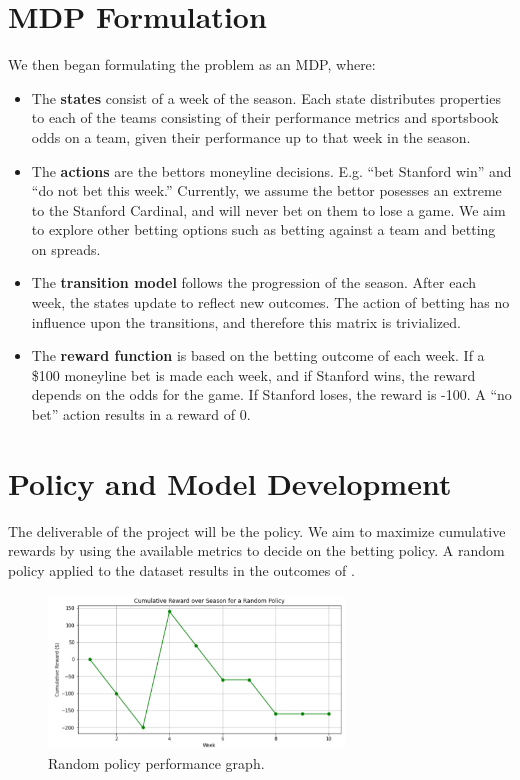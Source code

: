 \documentclass{article}
\begin{document}
\section*{MDP Formulation}

We then began formulating the problem as an MDP, where:
\begin{itemize}
    \item The \textbf{states} consist of a week of the season. Each state distributes properties to each of the teams consisting of their performance metrics and sportsbook odds on a team, given their performance up to that week in the season.
    \item The \textbf{actions} are the bettors moneyline decisions.  E.g. “bet Stanford win” and “do not bet this week.” Currently, we assume the bettor posesses an extreme to the Stanford Cardinal, and will never bet on them to lose a game. We aim to explore other betting options such as betting against a team and betting on spreads.
    \item The \textbf{transition model} follows the progression of the season. After each week, the states update to reflect new outcomes.  The action of betting has no influence upon the transitions, and therefore this matrix is trivialized.
    \item The \textbf{reward function} is based on the betting outcome of each week. If a \$100 moneyline bet is made each week, and if Stanford wins, the reward depends on the odds for the game. If Stanford loses, the reward is -100. A “no bet” action results in a reward of 0.
\end{itemize}

\section*{Policy and Model Development}

The deliverable of the project will be the policy. We aim to maximize cumulative rewards by using the available metrics to decide on the betting policy. A random policy applied to the dataset results 
in the outcomes of .

\begin{figure}[h!]
    \centering
    \includegraphics[width=0.7\textwidth]{season_reward.png}
    \caption{Random policy performance graph.}
\end{figure}
\end{document}
